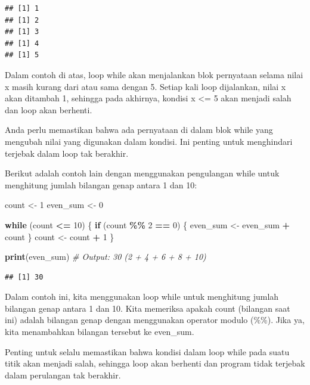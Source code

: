 \documentclass[
]{book}
\newenvironment{Shaded}{\begin{snugshade}}{\end{snugshade}}
\newcommand{\CommentTok}[1]{\textcolor[rgb]{0.56,0.35,0.01}{\textit{#1}}}
\newcommand{\ControlFlowTok}[1]{\textcolor[rgb]{0.13,0.29,0.53}{\textbf{#1}}}
\newcommand{\DecValTok}[1]{\textcolor[rgb]{0.00,0.00,0.81}{#1}}
\newcommand{\FunctionTok}[1]{\textcolor[rgb]{0.13,0.29,0.53}{\textbf{#1}}}
\newcommand{\NormalTok}[1]{#1}
\newcommand{\OtherTok}[1]{\textcolor[rgb]{0.56,0.35,0.01}{#1}}
\newcommand{\SpecialCharTok}[1]{\textcolor[rgb]{0.81,0.36,0.00}{\textbf{#1}}}
\begin{document}
\begin{verbatim}
## [1] 1
## [1] 2
## [1] 3
## [1] 4
## [1] 5
\end{verbatim}

Dalam contoh di atas, loop while akan menjalankan blok pernyataan selama nilai x masih kurang dari atau sama dengan 5. Setiap kali loop dijalankan, nilai x akan ditambah 1, sehingga pada akhirnya, kondisi x \textless= 5 akan menjadi salah dan loop akan berhenti.

Anda perlu memastikan bahwa ada pernyataan di dalam blok while yang mengubah nilai yang digunakan dalam kondisi. Ini penting untuk menghindari terjebak dalam loop tak berakhir.

Berikut adalah contoh lain dengan menggunakan pengulangan while untuk menghitung jumlah bilangan genap antara 1 dan 10:

\begin{Shaded}
\begin{Highlighting}[]
\NormalTok{count }\OtherTok{\textless{}{-}} \DecValTok{1}
\NormalTok{even\_sum }\OtherTok{\textless{}{-}} \DecValTok{0}

\ControlFlowTok{while}\NormalTok{ (count }\SpecialCharTok{\textless{}=} \DecValTok{10}\NormalTok{) \{}
  \ControlFlowTok{if}\NormalTok{ (count }\SpecialCharTok{\%\%} \DecValTok{2} \SpecialCharTok{==} \DecValTok{0}\NormalTok{) \{}
\NormalTok{    even\_sum }\OtherTok{\textless{}{-}}\NormalTok{ even\_sum }\SpecialCharTok{+}\NormalTok{ count}
\NormalTok{  \}}
\NormalTok{  count }\OtherTok{\textless{}{-}}\NormalTok{ count }\SpecialCharTok{+} \DecValTok{1}
\NormalTok{\}}

\FunctionTok{print}\NormalTok{(even\_sum)  }\CommentTok{\# Output: 30 (2 + 4 + 6 + 8 + 10)}
\end{Highlighting}
\end{Shaded}

\begin{verbatim}
## [1] 30
\end{verbatim}

Dalam contoh ini, kita menggunakan loop while untuk menghitung jumlah bilangan genap antara 1 dan 10. Kita memeriksa apakah count (bilangan saat ini) adalah bilangan genap dengan menggunakan operator modulo (\%\%). Jika ya, kita menambahkan bilangan tersebut ke even\_sum.

Penting untuk selalu memastikan bahwa kondisi dalam loop while pada suatu titik akan menjadi salah, sehingga loop akan berhenti dan program tidak terjebak dalam perulangan tak berakhir.
\end{document}
